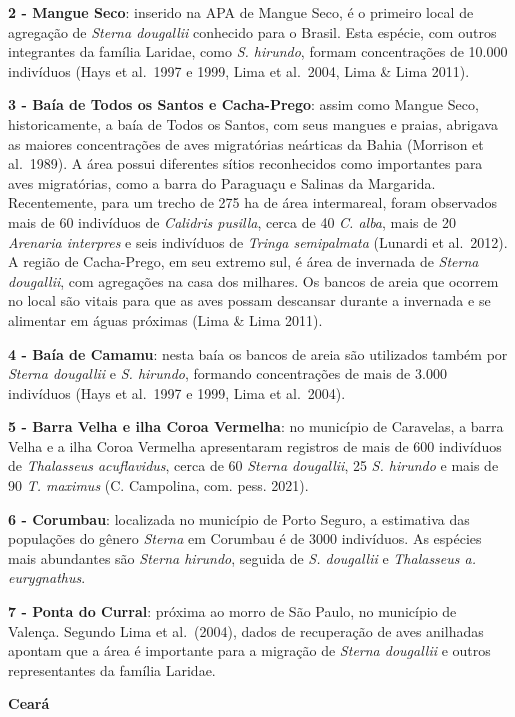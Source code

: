 \documentclass[
  oneside]{scrbook}
\begin{document}
\textbf{2 - Mangue Seco}: inserido na APA de Mangue Seco, é o primeiro local de agregação de \emph{Sterna dougallii} conhecido para o Brasil. Esta espécie, com outros integrantes da família Laridae, como \emph{S. hirundo}, formam concentrações de 10.000 indivíduos (Hays et al.~1997 e 1999, Lima et al.~2004, Lima \& Lima 2011).

\textbf{3 - Baía de Todos os Santos e Cacha-Prego}: assim como Mangue Seco, historicamente, a baía de Todos os Santos, com seus mangues e praias, abrigava as maiores concentrações de aves migratórias neárticas da Bahia (Morrison et al.~1989). A área possui diferentes sítios reconhecidos como importantes para aves migratórias, como a barra do Paraguaçu e Salinas da Margarida. Recentemente, para um trecho de 275 ha de área intermareal, foram observados mais de 60 indivíduos de \emph{Calidris pusilla}, cerca de 40 \emph{C. alba}, mais de 20 \emph{Arenaria interpres} e seis indivíduos de \emph{Tringa semipalmata} (Lunardi et al.~2012). A região de Cacha-Prego, em seu extremo sul, é área de invernada de \emph{Sterna dougallii}, com agregações na casa dos milhares. Os bancos de areia que ocorrem no local são vitais para que as aves possam descansar durante a invernada e se alimentar em águas próximas (Lima \& Lima 2011).

\textbf{4 - Baía de Camamu}: nesta baía os bancos de areia são utilizados também por \emph{Sterna dougallii} e \emph{S. hirundo}, formando concentrações de mais de 3.000 indivíduos (Hays et al.~1997 e 1999, Lima et al.~2004).

\textbf{5 - Barra Velha e ilha Coroa Vermelha}: no município de Caravelas, a barra Velha e a ilha Coroa Vermelha apresentaram registros de mais de 600 indivíduos de \emph{Thalasseus acuflavidus}, cerca de 60 \emph{Sterna dougallii}, 25 \emph{S. hirundo} e mais de 90 \emph{T. maximus} (C. Campolina, com. pess. 2021).

\textbf{6 - Corumbau}: localizada no município de Porto Seguro, a estimativa das populações do gênero \emph{Sterna} em Corumbau é de 3000 indivíduos. As espécies mais abundantes são \emph{Sterna hirundo}, seguida de \emph{S. dougallii} e \emph{Thalasseus a. eurygnathus}.

\textbf{7 - Ponta do Curral}: próxima ao morro de São Paulo, no município de Valença. Segundo Lima et al.~(2004), dados de recuperação de aves anilhadas apontam que a área é importante para a migração de \emph{Sterna dougallii} e outros representantes da família Laridae.

\textbf{Ceará}
\end{document}
